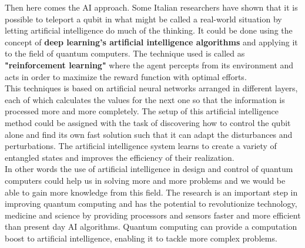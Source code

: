 \documentclass[10pt,a4paper,twoside]{article}
\begin{document}
Then here comes the AI approach. Some Italian researchers have shown that it is possible to teleport a qubit in what might be called a real-world situation by letting artificial intelligence do much of the thinking. It could be done using the concept of \textbf{deep learning’s artificial intelligence algorithms} and applying it to the field of quantum computers. The technique used is called as \textbf{"reinforcement learning"} where the agent percepts from its environment and acts in order to maximize the reward function with optimal efforts.\\

 This techniques is based on artificial neural networks arranged in different layers, each of which calculates the values for the next one so that the information is processed more and more completely. The setup of this artificial intelligence method could be assigned with the task of discovering how to control the qubit alone and find its own fast solution such that it can adapt the disturbances and perturbations. The artificial intelligence system learns to create a variety of entangled states and improves the efficiency of their realization.\\

In other words the use of artificial intelligence in design and control of quantum computers could help us in solving more and more problems and we would be able to gain more knowledge from this field. The research is an important step in improving quantum computing and has the potential to revolutionize technology, medicine and science by providing processors and sensors faster and more efficient than present day AI algorithms. Quantum computing can provide a computation boost to artificial intelligence, enabling it to tackle more complex problems.
\end{document}

